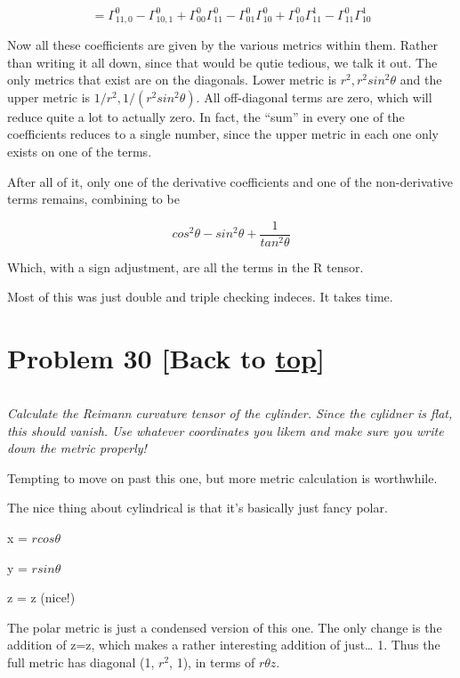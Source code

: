 \documentclass[landscape,letterpaper,10pt,english]{article}
\begin{document}
\[ = \Gamma^0_{11,0} - \Gamma^0_{10,1} + \Gamma^0_{0 0} \Gamma^0_{11} - \Gamma^0_{0 1} \Gamma^0_{10} + \Gamma^0_{1 0} \Gamma^1_{11} - \Gamma^0_{1 1} \Gamma^1_{10} \]

    Now all these coefficients are given by the various metrics within them.
Rather than writing it all down, since that would be qutie tedious, we
talk it out. The only metrics that exist are on the diagonals. Lower
metric is \(r^2, r^2sin^2\theta\) and the upper metric is
\(1/r^2, 1/(r^2sin^2\theta)\). All off-diagonal terms are zero, which
will reduce quite a lot to actually zero. In fact, the ``sum'' in every
one of the coefficients reduces to a single number, since the upper
metric in each one only exists on one of the terms.

After all of it, only one of the derivative coefficients and one of the
non-derivative terms remains, combining to be

\[cos^2\theta - sin^2\theta + \frac{1}{tan^2\theta}\]

Which, with a sign adjustment, are all the terms in the R tensor.

Most of this was just double and triple checking indeces. It takes time.

    \hypertarget{problem-30-back-to-top}{%
\section{\texorpdfstring{Problem 30 {[}Back to
\hyperref[toc]{top}{]}}{Problem 30 {[}Back to {]}}}\label{problem-30-back-to-top}}

\[\label{P30}\]

\emph{Calculate the Reimann curvature tensor of the cylinder. Since the
cylidner is flat, this should vanish. Use whatever coordinates you likem
and make sure you write down the metric properly!}

Tempting to move on past this one, but more metric calculation is
worthwhile.

    The nice thing about cylindrical is that it's basically just fancy
polar.

x = \(rcos\theta\)

y = \(rsin\theta\)

z = z (nice!)

The polar metric is just a condensed version of this one. The only
change is the addition of z=z, which makes a rather interesting addition
of just\ldots{} 1. Thus the full metric has diagonal (1, \(r^2\), 1), in
terms of \(r\theta z\).
\end{document}
